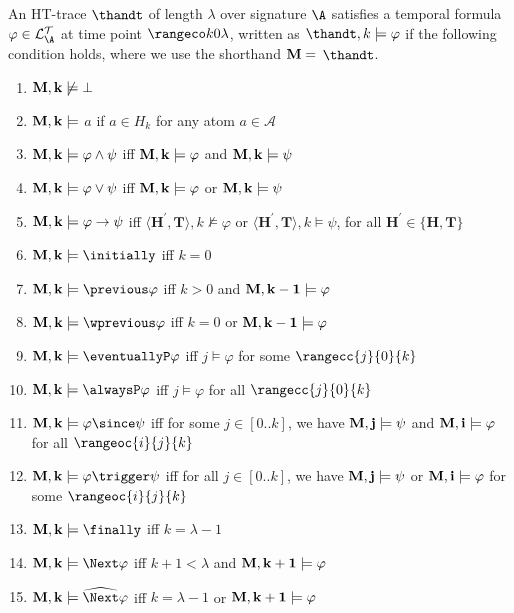 \begin{definition}
  An HT-trace $\thandt$ of length $\lambda$ over signature $\A$
  satisfies a temporal formula $\varphi \in \langat$ at
  time point $\kinlambda$, written as $\thandt,k \models \varphi$ if
  the following condition holds, where we use the shorthand $\bf{M} =$
  $\thandt$.
\begin{enumerate}
  \item $\bf{M}, k \not \models \bot$
  \item $\bf{M},k \models$ $a$ if $a \in H_{k}$ for any atom $a \in \mathcal{A}$
  \item $\bf{M},k \models \varphi \wedge \psi$ iff $\bf{M}, k \models \varphi$ and $\bf{M}, k \models \psi$
  \item $\bf{M},k \models \varphi \vee \psi$ iff $\bf{M}, k \models \varphi$ or $\bf{M}, k \models \psi$
  \item $\bf{M},k \models \varphi \rightarrow \psi$ iff 
    $\langle \bm{H}^{\prime},\bm{T} \rangle, k \not \models \varphi$ 
    or $\langle \bm{H}^{\prime},\bm{T} \rangle, k \models \psi$, 
    for all $\bm{H}^{\prime} \in\{\bm{H}, \bm{T}\}$
  \item $\bf{M},k \models \initially$ iff $k=0$
  \item $\bf{M},k \models \previous \varphi$ iff $k>0$ and $\bf{M},k-1 \models \varphi$
  \item $\bf{M},k \models \wprevious \varphi$ iff $k=0$ or $\bf{M},k-1 \models \varphi$
  \item $\bf{M},k \models \eventuallyP \varphi$ iff $j \models \varphi$ for some $\rangecc{j}{0}{k}$  
  \item $\bf{M},k \models \alwaysP \varphi$ iff $j \models \varphi$ for all $\rangecc{j}{0}{k}$  
  \item $\bf{M},k \models \varphi \since \psi$ iff for some $j \in[0 . . k]$, we have $\bf{M}, j \models \psi$ and $\bf{M},i \models \varphi$ for all $\rangeoc{i}{j}{k}$
  \item $\bf{M},k \models \varphi \trigger \psi$ iff for all $j \in[0 . . k]$, we have $\bf{M}, j \models \psi$ or $\bf{M}, i \models \varphi$ for some $\rangeoc{i}{j}{k}$
  \item $\bf{M},k \models \finally$ iff $k=\lambda - 1$
  \item $\bf{M},k \models \Next \varphi$ iff $k+1<\lambda$ and $\bf{M}, k+1 \models \varphi$
  \item $\bf{M},k \models \wnext \varphi$ iff $k=\lambda-1$ or $\bf{M},k+1 \models \varphi$

\end{enumerate}
\end{definition}
